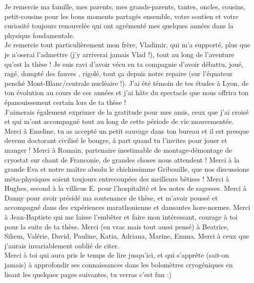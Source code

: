 \documentclass[
11pt, %
english, %
singlespacing, %
headsepline, %
]{MastersDoctoralThesis} %
\begin{document}
\begin{acknowledgements}
Je remercie ma famille, mes parents, mes grands-parents, tantes, oncles, cousins, petit-cousins pour les bons moments partagés ensemble, votre soutien et votre curiosité toujours renouvelée qui ont agrémenté mes quelques années dans la physique fondamentale.
\\

Je remercie tout particulièrement mon frère, Vladimir, qui m’a supporté, plus que je n’oserai l’admettre (j’y arriverai jamais Vlad !), tout au long de l’aventure qu’est la thèse ! Je suis ravi d’avoir vécu en ta compagnie d’avoir débattu, joué, ragé, dompté des fauves , rigolé, tout ça depuis notre repaire (sur l’équateur penché Mont-Blanc/centrale nucléaire !). J’ai été témoin de tes études à Lyon, de ton évolution au cours de ces années et j’ai hâte du spectacle que nous offrira ton épanouissement certain lors de ta thèse !
\\

J’aimerais également exprimer de la gratitude pour mes amis, ceux que j’ai croisé et qui m’ont accompagné tout au long de cette période de vie mouvementée. 
Merci à Emeline, tu as accepté un petit sauvage dans ton bureau et il est presque devenu doctorant civilisé le bougre, à part quand tu l’invites pour jouer et manger ! Merci à Romain, partenaire inestimable de montage-démontage de cryostat sur chant de Franconie, de grandes choses nous attendent ! Merci à la grande Eva et notre maître absolu le chichissimme Gribouille, que nos discussions méta-physiques soient toujours entrecoupées des meilleurs bêtises !  Merci à Hughes, second à la villicus E. pour l’hospitalité et les notes de sagesses. Merci à Danny pour avoir présidé ma soutenance de thèse, et m’avoir poussé et accompagné dans des expériences marathonienne et dansantes hors-normes. Merci à Jean-Baptiste qui me laisse l’embêter et faire mon intéressant, courage à toi pour la suite de ta thèse. Merci (en vrac mais tout aussi pensé) à Beatrice, Sihem, Valérie, David, Pauline, Katia, Adriana, Marine, Emma. Merci à ceux que j'aurais invariablement oublié de citer.
\\

Merci à toi qui aura pris le temps de lire jusqu’ici, et qui s’apprête (sait-on jamais) à approfondir ses connaissances dans les bolomètres cryogéniques en lisant les quelques pages suivantes, tu verras c'est fun :)


\end{acknowledgements}

\end{document}
